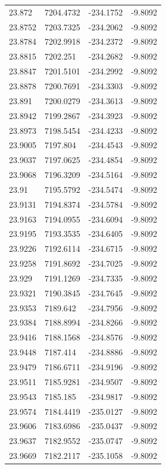 \begin{table}[H]
\begin{tabular}{llll}
23.872 & 7204.4732 & -234.1752 & -9.8092 \\
23.8752 & 7203.7325 & -234.2062 & -9.8092 \\
23.8784 & 7202.9918 & -234.2372 & -9.8092 \\
23.8815 & 7202.251 & -234.2682 & -9.8092 \\
23.8847 & 7201.5101 & -234.2992 & -9.8092 \\
23.8878 & 7200.7691 & -234.3303 & -9.8092 \\
23.891 & 7200.0279 & -234.3613 & -9.8092 \\
23.8942 & 7199.2867 & -234.3923 & -9.8092 \\
23.8973 & 7198.5454 & -234.4233 & -9.8092 \\
23.9005 & 7197.804 & -234.4543 & -9.8092 \\
23.9037 & 7197.0625 & -234.4854 & -9.8092 \\
23.9068 & 7196.3209 & -234.5164 & -9.8092 \\
23.91 & 7195.5792 & -234.5474 & -9.8092 \\
23.9131 & 7194.8374 & -234.5784 & -9.8092 \\
23.9163 & 7194.0955 & -234.6094 & -9.8092 \\
23.9195 & 7193.3535 & -234.6405 & -9.8092 \\
23.9226 & 7192.6114 & -234.6715 & -9.8092 \\
23.9258 & 7191.8692 & -234.7025 & -9.8092 \\
23.929 & 7191.1269 & -234.7335 & -9.8092 \\
23.9321 & 7190.3845 & -234.7645 & -9.8092 \\
23.9353 & 7189.642 & -234.7956 & -9.8092 \\
23.9384 & 7188.8994 & -234.8266 & -9.8092 \\
23.9416 & 7188.1568 & -234.8576 & -9.8092 \\
23.9448 & 7187.414 & -234.8886 & -9.8092 \\
23.9479 & 7186.6711 & -234.9196 & -9.8092 \\
23.9511 & 7185.9281 & -234.9507 & -9.8092 \\
23.9543 & 7185.185 & -234.9817 & -9.8092 \\
23.9574 & 7184.4419 & -235.0127 & -9.8092 \\
23.9606 & 7183.6986 & -235.0437 & -9.8092 \\
23.9637 & 7182.9552 & -235.0747 & -9.8092 \\
23.9669 & 7182.2117 & -235.1058 & -9.8092 \\

\end{tabular}
\end{table}
